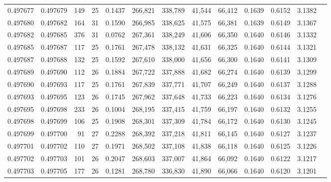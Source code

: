 \begin{tabular}{rrrrrrrrrrrrr}
0.497677 & 0.497679 & 149 &  25 &                                     0.1437 & 266,821 & 338,789 &  41,544 &  66,412 & 0.1639 & 0.6152 & 3.1382 \\
0.497680 & 0.497682 & 164 &  31 &                                     0.1590 & 266,985 & 338,625 &  41,575 &  66,381 & 0.1639 & 0.6149 & 3.1367 \\
0.497682 & 0.497685 & 376 &  31 &                                     0.0762 & 267,361 & 338,249 &  41,606 &  66,350 & 0.1640 & 0.6146 & 3.1332 \\
0.497685 & 0.497687 & 117 &  25 &                                     0.1761 & 267,478 & 338,132 &  41,631 &  66,325 & 0.1640 & 0.6144 & 3.1321 \\
0.497687 & 0.497688 & 132 &  25 &                                     0.1592 & 267,610 & 338,000 &  41,656 &  66,300 & 0.1640 & 0.6141 & 3.1309 \\
0.497689 & 0.497690 & 112 &  26 &                                     0.1884 & 267,722 & 337,888 &  41,682 &  66,274 & 0.1640 & 0.6139 & 3.1299 \\
0.497690 & 0.497693 & 117 &  25 &                                     0.1761 & 267,839 & 337,771 &  41,707 &  66,249 & 0.1640 & 0.6137 & 3.1288 \\
0.497693 & 0.497695 & 123 &  26 &                                     0.1745 & 267,962 & 337,648 &  41,733 &  66,223 & 0.1640 & 0.6134 & 3.1276 \\
0.497695 & 0.497698 & 233 &  26 &                                     0.1004 & 268,195 & 337,415 &  41,759 &  66,197 & 0.1640 & 0.6132 & 3.1255 \\
0.497698 & 0.497699 & 106 &  25 &                                     0.1908 & 268,301 & 337,309 &  41,784 &  66,172 & 0.1640 & 0.6130 & 3.1245 \\
0.497699 & 0.497700 &  91 &  27 &                                     0.2288 & 268,392 & 337,218 &  41,811 &  66,145 & 0.1640 & 0.6127 & 3.1237 \\
0.497701 & 0.497702 & 110 &  27 &                                     0.1971 & 268,502 & 337,108 &  41,838 &  66,118 & 0.1640 & 0.6125 & 3.1226 \\
0.497702 & 0.497703 & 101 &  26 &                                     0.2047 & 268,603 & 337,007 &  41,864 &  66,092 & 0.1640 & 0.6122 & 3.1217 \\
0.497703 & 0.497705 & 177 &  26 &                                     0.1281 & 268,780 & 336,830 &  41,890 &  66,066 & 0.1640 & 0.6120 & 3.1201 \\

\end{tabular}
